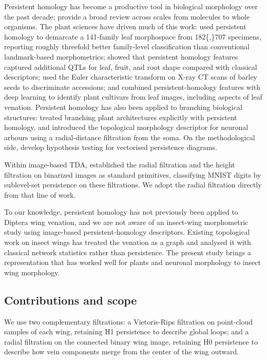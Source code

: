 \documentclass[
  a4paper,
  DIV=11,
  numbers=noendperiod]{scrartcl}
\begin{document}
Persistent homology has become a productive tool in biological
morphology over the past decade; \textcite{amezquita2020shape} provide a
broad review across scales from molecules to whole organisms. The plant
sciences have driven much of this work: \textcite{li2018topological}
used persistent homology to demarcate a 141-family leaf morphospace from
182\{,\}707 specimens, reporting roughly threefold better family-level
classification than conventional landmark-based morphometrics;
\textcite{li2018persistent} showed that persistent homology features
captured additional QTLs for leaf, fruit, and root shape compared with
classical descriptors; \textcite{amezquita2022measuring} used the Euler
characteristic transform on X-ray CT scans of barley seeds to
discriminate accessions; and \textcite{zhang2021mfcis} combined
persistent-homology features with deep learning to identify plant
cultivars from leaf images, including aspects of leaf venation.
Persistent homology has also been applied to branching biological
structures: \textcite{li2017persistent} treated branching plant
architectures explicitly with persistent homology, and
\textcite{kanari2018topological} introduced the topological morphology
descriptor for neuronal arbours using a radial-distance filtration from
the soma. On the methodological side, \textcite{moon2023hypothesis}
develop hypothesis testing for vectorised persistence diagrams.

Within image-based TDA, \textcite{garin2019topological} established the
radial filtration and the height filtration on binarized images as
standard primitives, classifying MNIST digits by sublevel-set
persistence on these filtrations. We adopt the radial filtration
directly from that line of work.

To our knowledge, persistent homology has not previously been applied to
Diptera wing venation, and we are not aware of an insect-wing
morphometric study using image-based persistent-homology descriptors.
Existing topological work on insect wings has treated the venation as a
graph and analysed it with classical network statistics rather than
persistence. The present study brings a representation that has worked
well for plants and neuronal morphology to insect wing morphology.

\subsection{Contributions and scope}\label{contributions-and-scope}

We use two complementary filtrations: a Vietoris-Rips filtration on
point-cloud samples of each wing, retaining H1 persistence to describe
global loops; and a radial filtration on the connected binary wing
image, retaining H0 persistence to describe how vein components merge
from the center of the wing outward.
\end{document}
